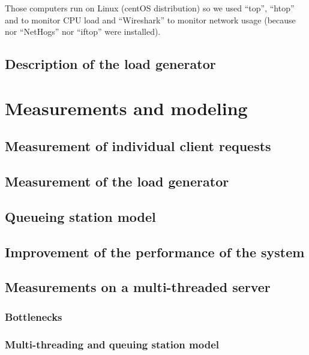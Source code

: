 Those computers run on Linux (centOS distribution) so we used \enquote{top},
\enquote{htop} and  to monitor CPU load and \enquote{Wireshark}
to monitor network usage (because nor \enquote{NetHogs} nor \enquote{iftop} were
installed). \newline

\subsection{Description of the load generator}
\label{sub:Description of the load generator}

\section{Measurements and modeling}
\label{sec:Measurements and modeling}

\subsection{Measurement of individual client requests}
\label{sub:Measurement of individual client requests}

\subsection{Measurement of the load generator}
\label{sub:Measurement of the load generator}

\subsection{Queueing station model}
\label{sub:Queueing station model}

\subsection{Improvement of the performance of the system}
\label{sub:Improvement of the performance of the system}

\subsection{Measurements on a multi-threaded server}
\label{sub:Measurements on a multi-threaded server}

\subsubsection{Bottlenecks}
\label{subs:Bottlenecks}


\subsubsection{Multi-threading and queuing station model}
\label{subs:Multi-threading and queuing station model}
